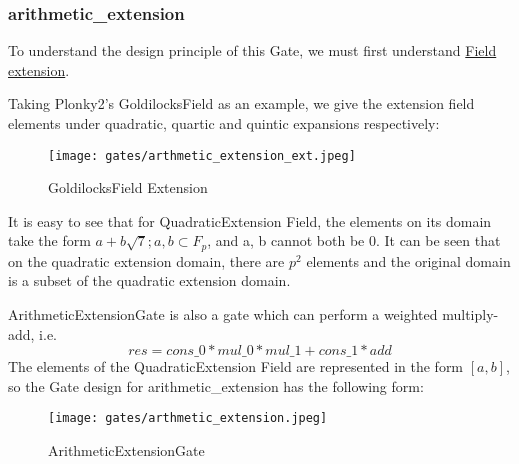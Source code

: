\subsubsection{arithmetic\_extension}

To understand the design principle of this Gate, we must first understand \href{https://en.wikipedia.org/wiki/Field_extension#Extension_field}{Field extension}. 


Taking Plonky2's GoldilocksField as an example, we give the extension field elements under quadratic, quartic and quintic expansions respectively:

\begin{figure}[!ht]
    \centering
    \texttt{[image: gates/arthmetic\_extension\_ext.jpeg]}
    \caption{GoldilocksField Extension}
    \label{fig:goldilocksfield-extension}
\end{figure}

It is easy to see that for QuadraticExtension Field, the elements on its domain take the form $a + b \sqrt{7}; a,b \subset F_p$, and a, b cannot both be 0.
It can be seen that on the quadratic extension domain, there are $p^2$ elements and the original domain is a subset of the quadratic extension domain.

ArithmeticExtensionGate is also a gate which can perform a weighted multiply-add, i.e.
\[res = cons\_0 * mul\_0 * mul\_1 + cons\_1 * add\]
The elements of the QuadraticExtension Field are represented in the form $[a, b]$, so the Gate design for arithmetic\_extension has the following form:

\begin{figure}[!ht]
    \centering
    \texttt{[image: gates/arthmetic\_extension.jpeg]}
    \caption{ArithmeticExtensionGate}
    \label{fig:arthmetic-extension}
\end{figure}